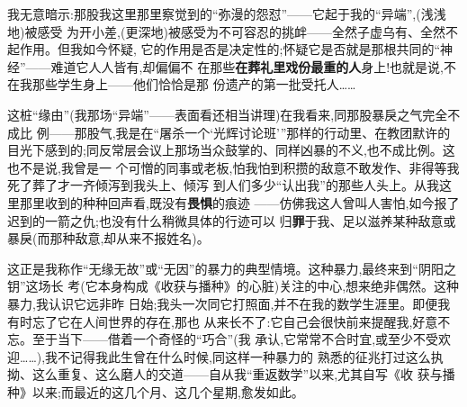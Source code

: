 我无意暗示:那股我这里那里察觉到的“弥漫的怨怼”——它起于我的“异端”,(浅浅地)被感受
为开小差,(更深地)被感受为不可容忍的挑衅——全然子虚乌有、全然不起作用。但我如今怀疑,
它的作用是否是决定性的;怀疑它是否就是那根共同的“神经”——难道它人人皆有,却偏偏不
在那些\textbf{在葬礼里戏份最重的人}身上!也就是说,不在我那些学生身上——他们恰恰是那
份遗产的第一批受托人……

这桩“缘由”(我那场“异端”——表面看还相当讲理)在我看来,同那股暴戾之气完全不成比
例——那股气,\dmark{}我是在“屠杀一个‘光辉讨论班’”那样的行动里、在教团默许的目光下感到的;同反常层会议上那场当众鼓掌的、同样凶暴的不义,也不成比例。这也不是说,我曾是一
个可憎的同事或老板,怕我怕到积攒的敌意不敢发作、非得等我死了葬了才一齐倾泻到我头上、倾泻
到人们多少“认出我”的那些人头上。从我这里那里收到的种种回声看,既没有\textbf{畏惧}的痕迹
——仿佛我这人曾叫人害怕,如今报了迟到的一箭之仇;也没有什么稍微具体的行迹可以
归\textbf{罪}于我、足以滋养某种敌意或暴戾(而那种敌意,却从来不报姓名)。

这正是我称作“无缘无故”或“无因”的暴力的典型情境。这种暴力,最终来到“阴阳之钥”这场长
考(它本身构成《收获与播种》的心脏)关注的中心,想来绝非偶然。这种暴力,我认识它远非昨
日始;我头一次同它打照面,并不在我的数学生涯里。即便我有时忘了它在人间世界的存在,那也
从来长不了:它自己会很快前来提醒我,好意不忘。至于当下——借着一个奇怪的“巧合”(我
承认,它常常不合时宜,或至少不受欢迎……),我不记得我此生曾在什么时候,同这样一种暴力的
\dmark{}熟悉的征兆打过这么执拗、这么重复、这么磨人的交道——自从我“重返数学”以来,尤其自写《收
获与播种》以来;而最近的这几个月、这几个星期,愈发如此。

